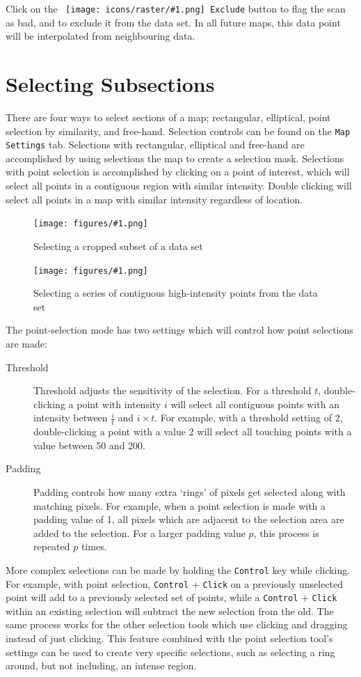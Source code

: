 \documentclass[article,twoside,11pt]{report}
\newcommand{\command}[1]{\texttt{#1}}
\newcommand{\icon}[1]{\texttt{[image: icons/raster/\#1.png]}}
\newcommand{\button}[2]{\ \command{\icon{#1} #2}}
\newcommand{\screenshot}[2]{%
\begin{figure}[h!]
\centering\texttt{[image: figures/\#1.png]}
\caption{#2}
\end{figure}
}
\newcommand{\tocsection}[1]{\section*{#1}\addcontentsline{toc}{section}{#1}}
\begin{document}
Click on the \button{choose-cancel}{Exclude} button to flag the scan as bad, and to  exclude it from the data set. In all future maps, this data point will be interpolated from neighbouring data.


\tocsection{Selecting Subsections}

There are four ways to select sections of a map; rectangular, elliptical, point selection by similarity, and free-hand. Selection controls can be found on the \command{Map Settings} tab. Selections with rectangular, elliptical and free-hand are accomplished by using selections the map to create a selection mask. Selections with point selection is accomplished by clicking on a point of interest, which will select all points in a contiguous region with similar intensity. Double clicking will select all points in a map with similar intensity regardless of location. 

\screenshot{select-subset}{Selecting a cropped subset of a data set}
\screenshot{select-points}{Selecting a series of contiguous high-intensity points from the data set}

The point-selection mode has two settings which will control how point selections are made: 

\begin{description}

\item [Threshold] Threshold adjusts the sensitivity of the selection. For a threshold $t$, double-clicking a point with intensity $i$ will select all contiguous points with an intensity between $\frac{i}{t}$ and $i\times t$. For example, with a threshold setting of 2, double-clicking a point with a value 2 will select all touching points with a value between 50 and 200.

\item [Padding] Padding controls how many extra `rings' of pixels get selected along with matching pixels. For example, when a point selection is made with a padding value of 1, all pixels which are adjacent to the selection area are added to the selection. For a larger padding value $p$, this process is repeated $p$ times.

\end{description}

More complex selections can be made by holding the \command{Control} key while clicking. For example, with point selection, \command{Control} + \command{Click} on a previously unselected point will add to a previously selected set of points, while a \command{Control} + \command{Click} within an existing selection will subtract the new selection from the old. The same process works for the other selection tools which use clicking and dragging instead of just clicking. This feature combined with the point selection tool's settings can be used to create very specific selections, such as selecting a ring around, but not including, an intense region.
\end{document}
